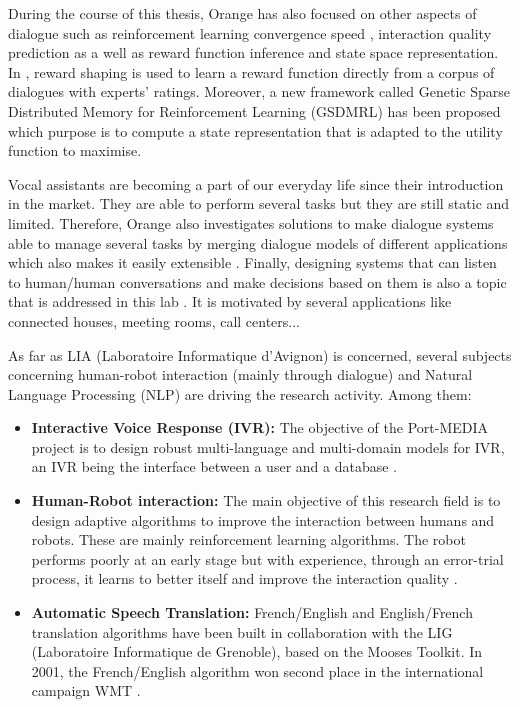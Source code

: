                 During the course of this thesis, Orange has also focused on other aspects of dialogue such as reinforcement learning convergence speed \cite{El-Asri2013a}, interaction quality prediction \cite{El-Asri2012,El-Asri2014d} as a well as reward function inference and state space representation. In \cite{El-Asri2012,El-Asri2016b}, reward shaping is used to learn a reward function directly from a corpus of dialogues with experts' ratings. Moreover, a new framework called Genetic Sparse Distributed Memory for Reinforcement Learning (GSDMRL) has been proposed \cite{El-Asri2016} which purpose is to compute a state representation that is adapted to the utility function to maximise.
								
								Vocal assistants are becoming a part of our everyday life since their introduction in the market. They are able to perform several tasks but they are still static and limited. Therefore, Orange also investigates solutions to make dialogue systems able to manage several tasks by merging dialogue models of different applications which also makes it easily extensible \cite{EkeinhorKomi2014}. Finally, designing systems that can listen to human/human conversations and make decisions based on them is also a topic that is addressed in this lab \cite{Barlier2015}. It is motivated by several applications like connected houses, meeting rooms, call centers...

                As far as LIA (Laboratoire Informatique d'Avignon) is concerned, several subjects concerning human-robot interaction (mainly through dialogue) and Natural Language Processing (NLP) are driving the research activity. Among them:

                \begin{itemize}
                  \item \textbf{Interactive Voice Response (IVR):} The objective of the Port-MEDIA \cite{Lefevre2012} project is to design robust multi-language and multi-domain models for IVR, an IVR being the interface between a user and a database \cite{Jabaian2013,Jabaian2016}.
                  \item \textbf{Human-Robot interaction:} The main objective of this research field is to design adaptive algorithms to improve the interaction between humans and robots. These are mainly reinforcement learning algorithms. The robot performs poorly at an early stage but with experience, through an error-trial process, it learns to better itself and improve the interaction quality \cite{Ferreira2013,Ferreira2015c,Ferreira2015d}.
                  \item \textbf{Automatic Speech Translation:} French/English and English/French translation algorithms have been built in collaboration with the LIG (Laboratoire Informatique de Grenoble), based on the Mooses Toolkit. In 2001, the French/English algorithm won second place in the international campaign WMT \cite{Potet2011,Rubino2012,Huet2013}.
                \end{itemize}

